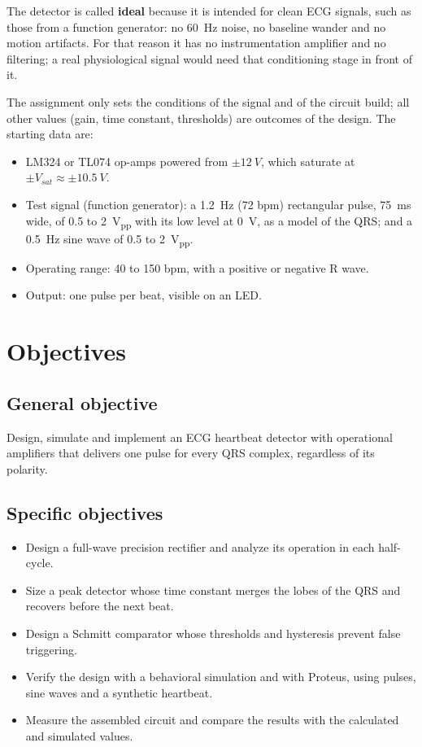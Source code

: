 \documentclass[11pt,letterpaper]{article}
\newcommand{\Vsat}{V_{sat}}
\begin{document}
The detector is called \textbf{ideal} because it is intended for clean ECG signals, such as those from a function generator: no \SI{60}{Hz} noise, no baseline wander and no motion artifacts. For that reason it has no instrumentation amplifier and no filtering; a real physiological signal would need that conditioning stage in front of it.

The assignment only sets the conditions of the signal and of the circuit build; all other values (gain, time constant, thresholds) are outcomes of the design. The starting data are:
\begin{itemize}
  \item LM324 or TL074 op-amps powered from $\pm\SI{12}{V}$, which saturate at $\pm\Vsat\approx\pm\SI{10.5}{V}$.
  \item Test signal (function generator): a \SI{1.2}{Hz} (72 bpm) rectangular pulse, \SI{75}{ms} wide, of 0.5 to \SI{2}{V_{pp}} with its low level at \SI{0}{V}, as a model of the QRS; and a \SI{0.5}{Hz} sine wave of 0.5 to \SI{2}{V_{pp}}.
  \item Operating range: 40 to 150 bpm, with a positive or negative R wave.
  \item Output: one pulse per beat, visible on an LED.
\end{itemize}

\section{Objectives}

\subsection{General objective}
Design, simulate and implement an ECG heartbeat detector with operational amplifiers that delivers one pulse for every QRS complex, regardless of its polarity.

\subsection{Specific objectives}
\begin{itemize}
  \item Design a full-wave precision rectifier and analyze its operation in each half-cycle.
  \item Size a peak detector whose time constant merges the lobes of the QRS and recovers before the next beat.
  \item Design a Schmitt comparator whose thresholds and hysteresis prevent false triggering.
  \item Verify the design with a behavioral simulation and with Proteus, using pulses, sine waves and a synthetic heartbeat.
  \item Measure the assembled circuit and compare the results with the calculated and simulated values.
\end{itemize}
\end{document}

